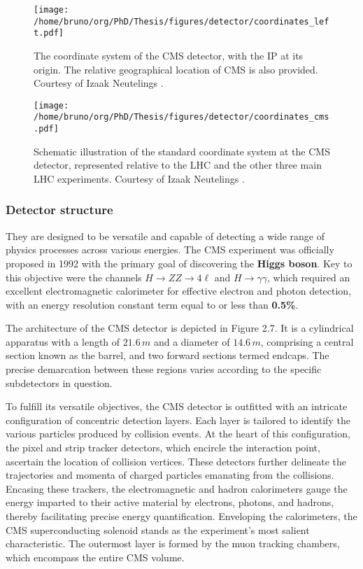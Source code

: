 \documentclass[11pt]{article}
\begin{document}
\begin{figure}
\texttt{[image: /home/bruno/org/PhD/Thesis/figures/detector/coordinates\_left.pdf]}
\caption{\label{fig:cords_cms}The coordinate system of the CMS detector, with the \ac{IP} at its origin. The relative geographical location of \ac{CMS} is also provided. Courtesy of Izaak Neutelings \cite{izaak_neutelings}.}
\end{figure}

\begin{figure}
\texttt{[image: /home/bruno/org/PhD/Thesis/figures/detector/coordinates\_cms.pdf]}
\caption{\label{fig:cords_lhc}Schematic illustration of the standard coordinate system at the CMS detector, represented relative to the \ac{LHC} and the other three main LHC experiments. Courtesy of Izaak Neutelings \cite{izaak_neutelings}.}
\end{figure}
\subsubsection{Detector structure}
\label{sec:orgece7160}
They are designed to be versatile and capable of detecting a wide range of physics processes across various energies.
The CMS experiment was officially proposed in 1992 with the primary goal of discovering the \textbf{Higgs boson}.
Key to this objective were the channels \(H \rightarrow ZZ \rightarrow 4\ell\) and \(H \rightarrow \gamma\gamma\), which required an excellent electromagnetic calorimeter for effective electron and photon detection, with an energy resolution constant term equal to or less than \textbf{0.5\%}.

The architecture of the CMS detector is depicted in Figure 2.7.
It is a cylindrical apparatus with a length of \(21.6\,m\) and a diameter of \(14.6\,m\), comprising a central section known as the barrel, and two forward sections termed endcaps.
The precise demarcation between these regions varies according to the specific subdetectors in question.

To fulfill its versatile objectives, the CMS detector is outfitted with an intricate configuration of concentric detection layers.
Each layer is tailored to identify the various particles produced by collision events.
At the heart of this configuration, the pixel and strip tracker detectors, which encircle the interaction point, ascertain the location of collision vertices.
These detectors further delineate the trajectories and momenta of charged particles emanating from the collisions.
Encasing these trackers, the electromagnetic and hadron calorimeters gauge the energy imparted to their active material by electrons, photons, and hadrons, thereby facilitating precise energy quantification.
Enveloping the calorimeters, the CMS superconducting solenoid stands as the experiment's most salient characteristic.
The outermost layer is formed by the muon tracking chambers, which encompass the entire CMS volume.
\end{document}
